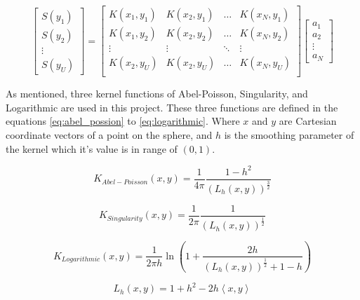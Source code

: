 \documentclass[12pt]{article}
\begin{document}
	\begin{equation}
		\begin{bmatrix}
			S(y_1) \\ S(y_2) \\ \vdots \\ S(y_U) 
		\end{bmatrix}
		= 
		\begin{bmatrix}
			K(x_1,y_1) & K(x_2,y_1) & \dots & K(x_N,y_1) \\
			K(x_1,y_2) & K(x_2,y_2) & \dots & K(x_N,y_2) \\
			\vdots & \vdots & \ddots & \vdots \\
			K(x_2,y_U) & K(x_2,y_U) & \dots & K(x_N,y_U) \\
		\end{bmatrix}
		\begin{bmatrix}
			a_1 \\ a_2 \\ \vdots \\ a_N
		\end{bmatrix}
		\label{eq:spherical_spline_ans_matrix}
	\end{equation}
	
	As mentioned, three kernel functions of Abel-Poisson, Singularity, and Logarithmic are used in this project. These three functions are defined in the equations \ref{eq:abel_possion} to \ref{eq:logarithmic}. Where $x$ and $y$ are Cartesian coordinate vectors of a point on the sphere, and $h$ is the smoothing parameter of the kernel which it's value is in range of $(0,1)$.
	
	\begin{equation}
		K_{Abel-Poisson}(x,y) = \frac{1}{4\pi} \frac{1-h^2}{(L_h(x,y))^{\frac{3}{2}}}
		\label{eq:abel_possion}
	\end{equation}

	\begin{equation}
		K_{Singularity}(x,y) = \frac{1}{2\pi} \frac{1}{(L_h(x,y))^{\frac{1}{2}}}
		\label{eq:singularity}
	\end{equation}
	
	\begin{equation}
		K_{Logarithmic}(x,y) = \frac{1}{2\pi h} \ln \left(1 +  \frac{2h}{(L_h(x,y))^{\frac{1}{2}} + 1 - h} \right)
		\label{eq:logarithmic}
	\end{equation}
	
	\begin{equation}
		L_h(x,y) = 1 + h^2 - 2h\left<x,y\right>
	\end{equation}
	
\end{document}
